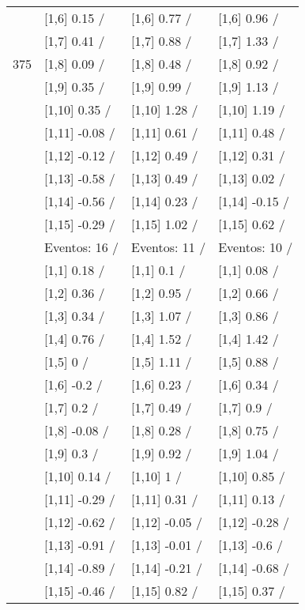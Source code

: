 \begin{table}
\begin{tabular}[t]{llll}
 & {}[1,6] 0.15  / & {}[1,6] 0.77  / & {}[1,6] 0.96  /\\
 & {}[1,7] 0.41  / & {}[1,7] 0.88  / & {}[1,7] 1.33  /\\
375 & {}[1,8] 0.09  / & {}[1,8] 0.48  / & {}[1,8] 0.92  /\\
\addlinespace
 & {}[1,9] 0.35  / & {}[1,9] 0.99  / & {}[1,9] 1.13  /\\
 & {}[1,10] 0.35  / & {}[1,10] 1.28  / & {}[1,10] 1.19  /\\
 & {}[1,11] -0.08  / & {}[1,11] 0.61  / & {}[1,11] 0.48  /\\
 & {}[1,12] -0.12  / & {}[1,12] 0.49  / & {}[1,12] 0.31  /\\
 & {}[1,13] -0.58  / & {}[1,13] 0.49  / & {}[1,13] 0.02  /\\
\addlinespace
 & {}[1,14] -0.56  / & {}[1,14] 0.23  / & {}[1,14] -0.15  /\\
 & {}[1,15] -0.29  / & {}[1,15] 1.02  / & {}[1,15] 0.62  /\\
 & Eventos:  16 / & Eventos:  11 / & Eventos:  10 /\\
 & {}[1,1] 0.18  / & {}[1,1] 0.1  / & {}[1,1] 0.08  /\\
 & {}[1,2] 0.36  / & {}[1,2] 0.95  / & {}[1,2] 0.66  /\\
\addlinespace
 & {}[1,3] 0.34  / & {}[1,3] 1.07  / & {}[1,3] 0.86  /\\
 & {}[1,4] 0.76  / & {}[1,4] 1.52  / & {}[1,4] 1.42  /\\
 & {}[1,5] 0  / & {}[1,5] 1.11  / & {}[1,5] 0.88  /\\
 & {}[1,6] -0.2  / & {}[1,6] 0.23  / & {}[1,6] 0.34  /\\
 & {}[1,7] 0.2  / & {}[1,7] 0.49  / & {}[1,7] 0.9  /\\
\addlinespace
500 & {}[1,8] -0.08  / & {}[1,8] 0.28  / & {}[1,8] 0.75  /\\
 & {}[1,9] 0.3  / & {}[1,9] 0.92  / & {}[1,9] 1.04  /\\
 & {}[1,10] 0.14  / & {}[1,10] 1  / & {}[1,10] 0.85  /\\
 & {}[1,11] -0.29  / & {}[1,11] 0.31  / & {}[1,11] 0.13  /\\
 & {}[1,12] -0.62  / & {}[1,12] -0.05  / & {}[1,12] -0.28  /\\
\addlinespace
 & {}[1,13] -0.91  / & {}[1,13] -0.01  / & {}[1,13] -0.6  /\\
 & {}[1,14] -0.89  / & {}[1,14] -0.21  / & {}[1,14] -0.68  /\\
 & {}[1,15] -0.46  / & {}[1,15] 0.82  / & {}[1,15] 0.37  /\\
\bottomrule
\end{tabular}
\end{table}
